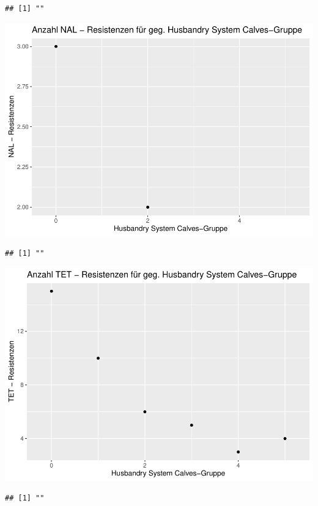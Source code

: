 \documentclass[
]{article}
\begin{document}
\begin{verbatim}
## [1] ""
\end{verbatim}

\includegraphics{NResistenzen_files/figure-latex/unnamed-chunk-7-37.pdf}

\begin{verbatim}
## [1] ""
\end{verbatim}

\includegraphics{NResistenzen_files/figure-latex/unnamed-chunk-7-38.pdf}

\begin{verbatim}
## [1] ""
\end{verbatim}
\end{document}
